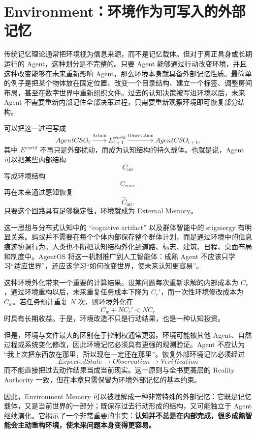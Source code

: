 \section{Environment：环境作为可写入的外部记忆}

传统记忆理论通常把环境视为信息来源，而不是记忆载体。但对于真正具身或长期运行的 Agent，这种划分是不完整的。只要 Agent 能够通过行动改变环境，并且这种改变能够在未来重新影响 Agent，那么环境本身就具备外部记忆性质。最简单的例子是把某个物体放在固定位置、改变一个目录结构、建立一个标签、调整房间布局，甚至在数字世界中重新组织文件。过去的认知决策被写进环境以后，未来 Agent 不需要重新内部记住全部决策过程，只需要重新观察环境即可恢复部分结构。

可以把这一过程写成
\[
AgentCSO_t
\xrightarrow{\mathrm{Action}}
E^{world}_{t+1}
\xrightarrow{\mathrm{Observation}}
AgentCSO_{t+k}.
\]
其中 \(E^{world}\) 不再只是外部扰动，而成为认知结构的持久载体。也就是说，Agent 可以把某些内部结构
\[
C_{\mathrm{int}}
\]
写成环境结构
\[
C_{\mathrm{env}},
\]
再在未来通过感知恢复
\[
\widehat{C}_{\mathrm{int}}.
\]
只要这个回路具有足够稳定性，环境就成为 External Memory。

这一思想与分布式认知中的 ``cognitive artifact'' 以及群体智能中的 stigmergy 有明显关系。蚂蚁并不需要在每个个体内部保存整个群体计划，而是通过环境中的信息痕迹协调行为。人类也不断把认知结构外化到道路、标志、建筑、日程、桌面布局和制度中。AgentOS 将这一机制推广到人工智能体：成熟 Agent 不应该只学习``适应世界''，还应该学习``如何改变世界，使未来认知更容易''。

这种环境外化带来一个重要的计算结果。设某问题每次重新求解的内部成本为 \(C_r\)，通过环境重构以后，未来重复任务成本下降为 \(C_r'\)，而一次性环境修改成本为 \(C_w\)。若任务预计重复 \(N\) 次，则环境外化在
\[
C_w+NC_r'
<
NC_r
\]
时具有长期收益。于是，环境改造不只是行动结果，也是一种认知投资。

但是，环境与文件最大的区别在于控制权通常更弱。环境可能被其他 Agent、自然过程或系统变化修改，因此环境记忆必须具有更强的观测验证。Agent 不应认为 ``我上次把东西放在那里，所以现在一定还在那里''。恢复外部环境记忆必须经过
\[
ExpectedState
\rightarrow
Observation
\rightarrow
Verification
\]
而不能直接把过去动作结果当成当前现实。这一原则与全书更高层的 Reality Authority 一致，但在本章只需保留为环境外部记忆的基本约束。

因此，Environment Memory 可以被理解成一种非常特殊的外部记忆：它既是记忆载体，又是当前世界的一部分；既保存过去行动形成的结构，又可能独立于 Agent 继续演化。它揭示了一个非常重要的事实：\textbf{认知并不总是在内部完成，很多成熟智能会主动重构环境，使未来问题本身变得更容易。}

